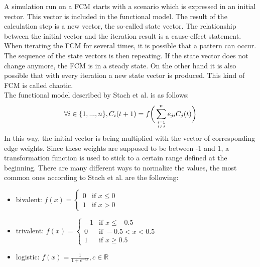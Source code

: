 \documentclass[conference]{IEEEtran}
\begin{document}
A simulation run on a FCM starts with a scenario which is expressed in an initial vector. This vector is included in the functional model. The result of the calculation step is a new vector, the so-called state vector. The relationship between the initial vector and the iteration result is a cause-effect statement.\\
When iterating the FCM for several times, it is possible that a pattern can occur. The sequence of the state vectors is then repeating. If the state vector does not change anymore, the FCM is in a steady state. On the other hand it is also possible that with every iteration a new state vector is produced. This kind of FCM is called chaotic.\\
The functional model described by Stach et al. \cite{stach2005} is as follows:\\
\begin{equation}
\forall i \in \{1,...,n\},C_{i}(t+1) = f  \bigg(\sum_{i=1 \atop i \neq j}^{n} e_{ji}C_{j}(t)\bigg)
\end{equation}
In this way, the initial vector is being multiplied with the vector of corresponding edge weights. Since these weights are supposed to be between -1 and 1, a transformation function is used to stick to a certain range defined at the beginning. There are many different ways to normalize the values, the most common ones according to Stach et al. \cite{stach2005} are the following:
\begin{itemize}
\item bivalent: \begin{math} f(x) = \begin{cases} 
0 & \text{if } x \leq 0\\ 
1 & \text{if } x > 0
\end{cases} \end{math}
\item trivalent: \begin{math} f(x) = \begin{cases}
-1 & \text{if } x \leq -0.5\\
0 & \text{if } -0.5 < x < 0.5\\
1 & \text{if } x \geq 0.5
\end{cases} \end{math}
\item logistic: \begin{math} f(x) = \frac{1}{1+e^{-cx}}, c \in \mathbb{R} \end{math}
\end{itemize}
\end{document}
